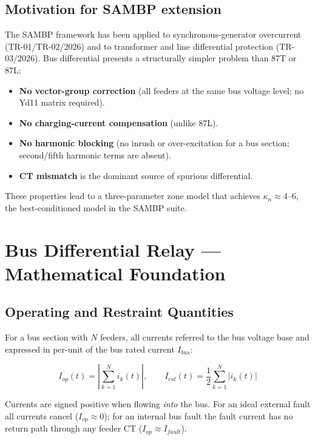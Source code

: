 \documentclass[12pt,a4paper]{article}
\newcommand{\kappan}{\kappa_n}
\newcommand{\Iop}{I_{op}}
\newcommand{\Irst}{I_{rst}}
\begin{document}
\subsection*{Motivation for SAMBP extension}

The SAMBP framework has been applied to synchronous-generator overcurrent
(TR-01/TR-02/2026) and to transformer and line differential protection
(TR-03/2026).  Bus differential presents a structurally simpler problem than
87T or 87L:

\begin{itemize}
  \item \textbf{No vector-group correction} (all feeders at the same bus
    voltage level; no Yd11 matrix required).
  \item \textbf{No charging-current compensation} (unlike 87L).
  \item \textbf{No harmonic blocking} (no inrush or over-excitation for a
    bus section; second/fifth harmonic terms are absent).
  \item \textbf{CT mismatch} is the dominant source of spurious differential.
\end{itemize}

These properties lead to a three-parameter zone model that achieves
$\kappan \approx 4$--$6$, the best-conditioned model in the SAMBP suite.

\section{Bus Differential Relay — Mathematical Foundation}
\label{sec:math}

\subsection{Operating and Restraint Quantities}
\label{sec:op_rst}

For a bus section with $N$ feeders, all currents referred to the bus voltage
base and expressed in per-unit of the bus rated current $I_{bus}$:

\begin{equation}
  \Iop(t) = \left|\sum_{k=1}^{N} i_k(t)\right|, \qquad
  \Irst(t) = \frac{1}{2}\sum_{k=1}^{N} |i_k(t)|
  \label{eq:op_rst}
\end{equation}

Currents are signed positive when flowing \emph{into} the bus.  For an ideal
external fault all currents cancel ($\Iop \approx 0$); for an internal bus
fault the fault current has no return path through any feeder CT
($\Iop \approx I_{fault}$).
\end{document}
